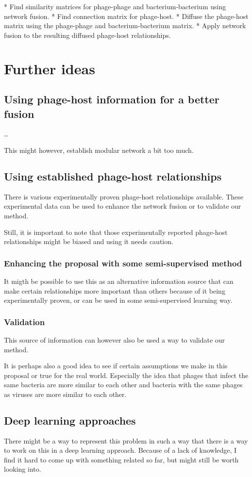 \documentclass{article}
\begin{document}
 * Find similarity matrices for phage-phage and bacterium-bacterium using network fusion.
 * Find connection matrix for phage-host.
 * Diffuse the phage-host matrix using the phage-phage and bacterium-bacterium matrix.
 * Apply network fusion to the resulting diffused phage-host relationships.

\section{Further ideas}

\subsection{Using phage-host information for a better fusion}

\ldots

This might however, establish modular network a bit too much.

\subsection{Using established phage-host relationships}

There is various experimentally proven phage-host relationships available. 
These experimental data can be used to enhance the network fusion or 
to validate our method. 

Still, it is important to note that those experimentally reported phage-host
relationships might be biased and using it needs caution.

\subsubsection{Enhancing the proposal with some semi-supervised method}
It migth be possible to use this as an alternative information source that
can make certain relationships more important than others because
of it being experimentally proven, or can be used in some semi-supervised
learning way.

\subsubsection{Validation}

This source of information can however also be used a way to validate
our method. 

It is perhaps also a good idea to see if certain assumptions we make in 
this proposal or true for the real world. 
Especially the idea that phages that infect the same
bacteria are more similar to each other and bacteria with the same phages
as viruses are more similar to each other.

\subsection{Deep learning approaches}

There might be a way to represent this problem in such a way that there is a 
way to work on this in a deep learning approach. Because of a lack of knowledge, 
I find it hard to come up with something related so far, but might still
be worth looking into.

\printbibliography{}
\end{document}
